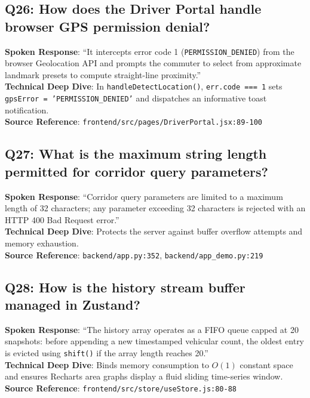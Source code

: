 \subsection*{Q26: How does the Driver Portal handle browser GPS permission denial?}
\begin{interviewbox}
\textbf{Spoken Response}: ``It intercepts error code 1 (\texttt{PERMISSION\_DENIED}) from the browser Geolocation API and prompts the commuter to select from approximate landmark presets to compute straight-line proximity.''\\
\textbf{Technical Deep Dive}: In \texttt{handleDetectLocation()}, \texttt{err.code === 1} sets \texttt{gpsError = 'PERMISSION\_DENIED'} and dispatches an informative toast notification.\\
\textbf{Source Reference}: \texttt{frontend/src/pages/DriverPortal.jsx:89-100}
\end{interviewbox}

\subsection*{Q27: What is the maximum string length permitted for corridor query parameters?}
\begin{interviewbox}
\textbf{Spoken Response}: ``Corridor query parameters are limited to a maximum length of 32 characters; any parameter exceeding 32 characters is rejected with an HTTP 400 Bad Request error.''\\
\textbf{Technical Deep Dive}: Protects the server against buffer overflow attempts and memory exhaustion.\\
\textbf{Source Reference}: \texttt{backend/app.py:352}, \texttt{backend/app\_demo.py:219}
\end{interviewbox}

\subsection*{Q28: How is the history stream buffer managed in Zustand?}
\begin{interviewbox}
\textbf{Spoken Response}: ``The history array operates as a FIFO queue capped at 20 snapshots: before appending a new timestamped vehicular count, the oldest entry is evicted using \texttt{shift()} if the array length reaches 20.''\\
\textbf{Technical Deep Dive}: Binds memory consumption to $O(1)$ constant space and ensures Recharts area graphs display a fluid sliding time-series window.\\
\textbf{Source Reference}: \texttt{frontend/src/store/useStore.js:80-88}
\end{interviewbox}

